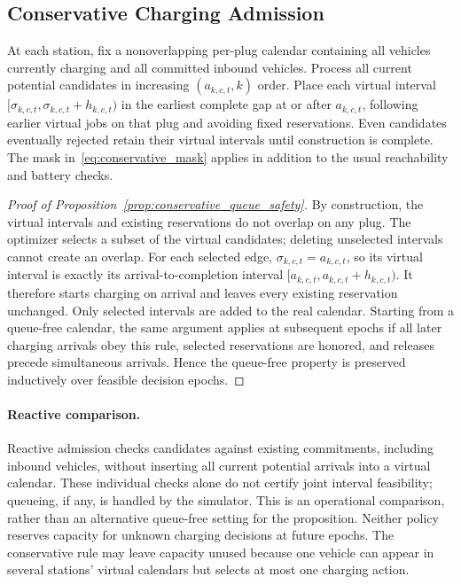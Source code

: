 \subsection{Conservative Charging Admission}
\label{app:conservative_admission}
At each station, fix a nonoverlapping per-plug calendar containing all
vehicles currently charging and all committed inbound vehicles. Process
all current potential candidates in increasing $(a_{k,c,t},k)$ order.
Place each virtual interval
$[\sigma_{k,c,t},\sigma_{k,c,t}+h_{k,c,t})$ in the earliest complete gap
at or after $a_{k,c,t}$, following earlier virtual jobs on that plug
and avoiding fixed reservations. Even
candidates eventually rejected retain their virtual intervals until
construction is complete. The mask in~\eqref{eq:conservative_mask}
applies in addition to the usual reachability and battery checks.

\begin{proof}[Proof of Proposition~\ref{prop:conservative_queue_safety}]
By construction, the virtual intervals and existing reservations do
not overlap on any plug. The optimizer selects a subset of the virtual
candidates; deleting unselected intervals cannot create an overlap.
For each selected edge, $\sigma_{k,c,t}=a_{k,c,t}$, so its virtual
interval is exactly its arrival-to-completion interval
$[a_{k,c,t},a_{k,c,t}+h_{k,c,t})$. It therefore starts charging on
arrival and leaves every existing reservation unchanged. Only selected
intervals are added to the real calendar. Starting from a queue-free
calendar, the same argument applies at subsequent epochs if all later
charging arrivals obey this rule, selected reservations are honored,
and releases precede simultaneous arrivals. Hence the queue-free
property is preserved inductively over feasible decision epochs.
\end{proof}

\paragraph{Reactive comparison.}
Reactive admission checks candidates against existing commitments,
including inbound vehicles, without inserting all current potential
arrivals into a virtual calendar. These individual checks alone do not
certify joint interval feasibility; queueing, if any, is handled by the
simulator. This is an operational comparison, rather than an alternative
queue-free setting for the proposition. Neither policy reserves capacity
for unknown charging decisions at future epochs. The conservative rule
may leave capacity unused because one vehicle can appear in several
stations' virtual calendars but selects at most one charging action.

